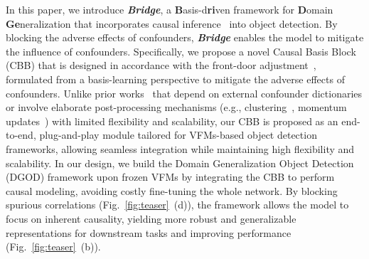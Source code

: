 In this paper, we introduce \textbf{\textit{Bridge}}, a \textbf{B}asis-d\textbf{ri}ven framework for \textbf{D}omain \textbf{Ge}neralization that incorporates causal inference~\cite{pearl2016causal,neuberg2003causality} into object detection. 
By blocking the adverse effects of confounders,
\textbf{\textit{Bridge}} enables the model to mitigate the influence of confounders.
Specifically, we propose a novel Causal Basis Block (CBB) that is designed in accordance with the front-door adjustment~\cite{pearl2018book}, formulated from a basis-learning perspective to mitigate the adverse effects of confounders.
Unlike prior works~\cite{wang2024vision,liang2024confounded,zhang2022multiple,zhang2020causal} that depend on external confounder dictionaries or involve elaborate post-processing mechanisms (e.g., clustering~\cite{zhang2020causal}, momentum updates~\cite{liang2024confounded}) with limited flexibility and scalability,
our CBB is proposed as an end-to-end, plug-and-play module tailored for VFMs-based object detection frameworks, allowing seamless integration while maintaining high flexibility and scalability.
In our design, we build the Domain Generalization Object Detection (DGOD) framework upon frozen VFMs by integrating the CBB to perform causal modeling, avoiding costly fine-tuning the whole network. 
By blocking spurious correlations (Fig.~\ref{fig:teaser}~(d)), the framework allows the model to focus on inherent causality, yielding more robust and generalizable representations for downstream tasks and improving performance (Fig.~\ref{fig:teaser}~(b)).



